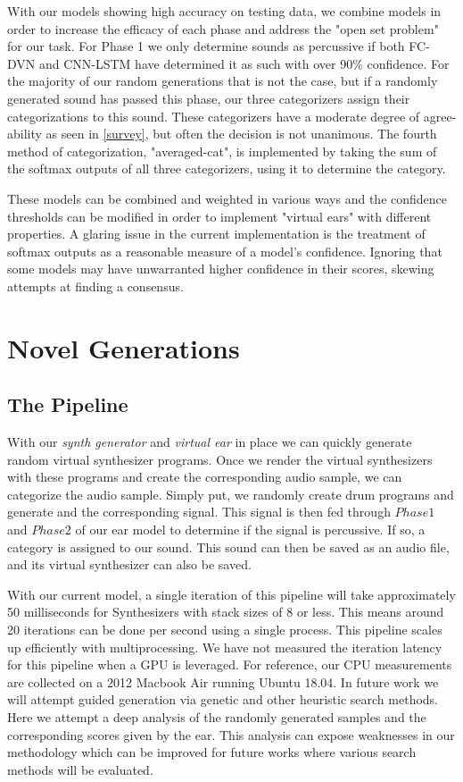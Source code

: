 \documentclass{nime-alternate} %
\begin{document}
With our models showing high accuracy on testing data, we combine models in order to increase the efficacy of each phase and address the "open set problem" for our task. For Phase 1 we only determine sounds as percussive if both FC-DVN and CNN-LSTM have determined it as such with over 90\% confidence. For the majority of our random generations that is not the case, but if a randomly generated sound has passed this phase, our three categorizers assign their categorizations to this sound. These categorizers have a moderate degree of agree-ability as seen in \ref{survey}, but often the decision is not unanimous. The fourth method of categorization, "averaged-cat", is implemented by taking the sum of the softmax outputs of all three categorizers, using it to determine the category. 

These models can be combined and weighted in various ways and the confidence thresholds can be modified in order to implement "virtual ears" with different properties. A glaring issue in the current implementation is the treatment of softmax outputs as a reasonable measure of a model's confidence. Ignoring that some models may have unwarranted higher confidence in their scores, skewing attempts at finding a consensus. 

\section{Novel Generations}
\label{gens}
\subsection{The Pipeline}
 With our \emph{synth generator} and \emph{virtual ear} in place we can quickly generate random virtual synthesizer programs. Once we render the virtual synthesizers with these programs and create the corresponding audio sample, we can categorize the audio sample. Simply put, we randomly create drum programs and generate and the corresponding signal. This signal is then fed through $Phase 1$ and $Phase 2$ of our ear model to determine if the signal is percussive. If so, a category is assigned to our sound. This sound can then be saved as an audio file, and its virtual synthesizer can also be saved.
 
 With our current model, a single iteration of this pipeline will take approximately 50 milliseconds for Synthesizers with stack sizes of 8 or less. This means around 20 iterations can be done per second using a single process. This pipeline scales up efficiently with multiprocessing. We have not measured the iteration latency for this pipeline when a GPU is leveraged. For reference, our CPU measurements are collected on a 2012 Macbook Air running Ubuntu 18.04.
 In future work we will attempt guided generation via genetic and other heuristic search methods. Here we attempt a deep analysis of the randomly generated samples and the corresponding scores given by the ear. This analysis can expose weaknesses in our methodology which can be improved for future works where various search methods will be evaluated.
  
\end{document}
